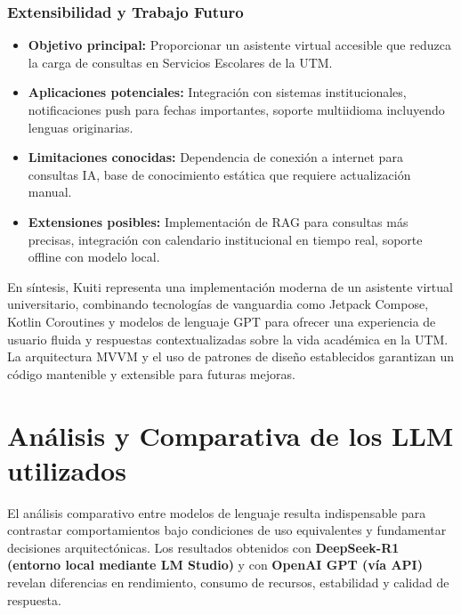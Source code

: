 \documentclass[12pt,a4paper]{report}
\numberwithin{figure}{section}
\begin{document}
\vspace{1em}
\subsection{Extensibilidad y Trabajo Futuro}
\label{subsec:extensibilidad}

\begin{itemize}
  \item \textbf{Objetivo principal:} Proporcionar un asistente virtual accesible que reduzca la carga de consultas en Servicios Escolares de la UTM.
  \item \textbf{Aplicaciones potenciales:} Integración con sistemas institucionales, notificaciones push para fechas importantes, soporte multiidioma incluyendo lenguas originarias.
  \item \textbf{Limitaciones conocidas:} Dependencia de conexión a internet para consultas IA, base de conocimiento estática que requiere actualización manual.
  \item \textbf{Extensiones posibles:} Implementación de RAG para consultas más precisas, integración con calendario institucional en tiempo real, soporte offline con modelo local.
\end{itemize}

\vspace{0.5em}

\noindent En síntesis, Kuiti representa una implementación moderna de un asistente virtual universitario, combinando tecnologías de vanguardia como Jetpack Compose, Kotlin Coroutines y modelos de lenguaje GPT para ofrecer una experiencia de usuario fluida y respuestas contextualizadas sobre la vida académica en la UTM. La arquitectura MVVM y el uso de patrones de diseño establecidos garantizan un código mantenible y extensible para futuras mejoras.



\chapter{Análisis y Comparativa de los LLM utilizados}
\label{ch:analisis_llm}

El análisis comparativo entre modelos de lenguaje resulta indispensable para contrastar comportamientos bajo condiciones de uso equivalentes y fundamentar decisiones arquitectónicas.  
Los resultados obtenidos con \textbf{DeepSeek-R1 (entorno local mediante LM Studio)} y con \textbf{OpenAI GPT (vía API)} revelan diferencias en rendimiento, consumo de recursos, estabilidad y calidad de respuesta.
\end{document}
